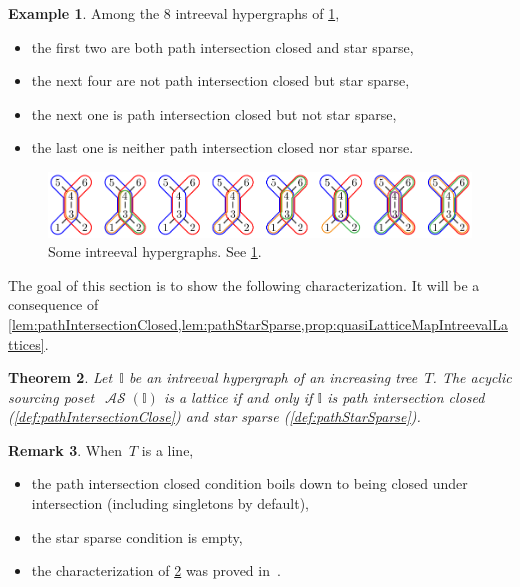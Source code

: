 \documentclass{amsart}
\newtheorem{theorem}{Theorem}[section]
\theoremstyle{definition}
\newtheorem{example}[theorem]{Example}
\newtheorem{remark}[theorem]{Remark}
\DeclareMathOperator{\ASour}{\mathcal{AS}}  %
\newcommand{\II}{\mathbb I} %
\begin{document}
\begin{example}
\label{exm:intreevalHypergraphs}
Among the $8$ intreeval hypergraphs of \cref{fig:intreevalHypergraphs},
\begin{itemize}
\item the first two are both path intersection closed and star sparse,
\item the next four are not path intersection closed but star sparse,
\item the next one is path intersection closed but not star sparse,
\item the last one is neither path intersection closed nor star sparse.
\end{itemize}

\begin{figure}[b]
	\centerline{\includegraphics[scale=.8]{intreevalHypergraphs}}
	\caption{Some intreeval hypergraphs. See \cref{exm:intreevalHypergraphs}.}
	\label{fig:intreevalHypergraphs}
\end{figure}
\end{example}

The goal of this section is to show the following characterization.
It will be a consequence of \cref{lem:pathIntersectionClosed,lem:pathStarSparse,prop:quasiLatticeMapIntreevalLattices}.

\begin{theorem}
\label{thm:intreevalLattices}
Let~$\II$ be an intreeval hypergraph of an increasing tree~$T$.
The acyclic sourcing poset~$\ASour(\II)$ is a lattice if and only if $\II$ is path intersection closed (\cref{def:pathIntersectionClose}) and star sparse (\cref{def:pathStarSparse}).
\end{theorem}

\begin{remark}
When~$T$ is a line, 
\begin{itemize}
\item the path intersection closed condition boils down to being closed under intersection (including singletons by default),
\item the star sparse condition is empty,
\item the characterization of \cref{thm:intreevalLattices} was proved in~\cite[Thm.~A]{BergeronPilaud}.
\end{itemize}
\end{remark}
\end{document}
